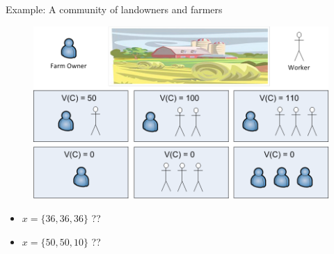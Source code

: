 \documentclass{beamer}
\begin{document}
\begin{frame}{Example: A community of landowners and farmers}
    \begin{figure}[htbp]
        \centering
        \includegraphics[width=0.85 \columnwidth]{figures/community_farm.png}
    \end{figure}
    
    \begin{itemize}
        \item $x = \{36,36,36\}$ ??
        \item $x = \{50,50,10\}$ ??
    \end{itemize}
\end{frame}
%
\end{document}
